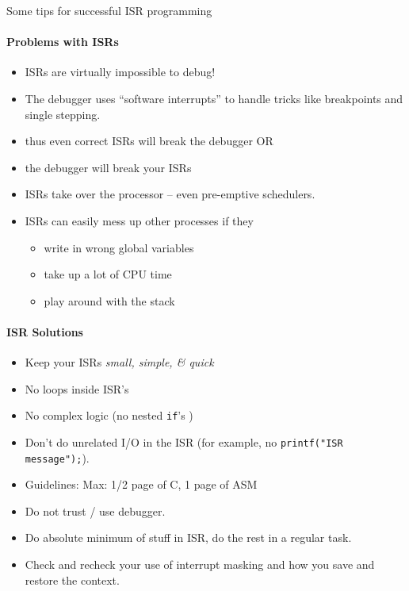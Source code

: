 \documentclass{article}	%
\begin{document}
 Some tips for successful ISR programming	%

\paragraph{Problems with ISRs}
\begin{itemize}
        \item ISRs are virtually impossible to debug!
        \item The debugger uses ``software interrupts'' to handle
        tricks like breakpoints and single stepping.
        \item thus even correct ISRs will break the debugger OR
        \item the debugger will break your ISRs
        \item ISRs take over the processor -- even pre-emptive
        schedulers.
        \item ISRs can easily mess up other processes if they

                \begin{itemize}
                \item write in wrong global variables
                \item take up a lot of CPU time
                \item play around with the stack
                \end{itemize}
\end{itemize}



\paragraph{ISR Solutions}


\begin{itemize}
        \item Keep your ISRs  {\it small, simple, \& quick }
        \item No loops inside ISR's
        \item No complex logic (no nested {\tt if}'s )
        \item Don't do unrelated I/O in the ISR (for example,
        no {\tt printf("ISR message");}).
        \item Guidelines: Max: 1/2 page of C, 1 page of ASM
        \item Do not trust / use debugger.
        \item Do absolute minimum of stuff in ISR, do the
        rest in a regular task.
        \item Check and recheck your use of interrupt masking
        and how you save and restore the context.

\end{itemize}
\end{document}
